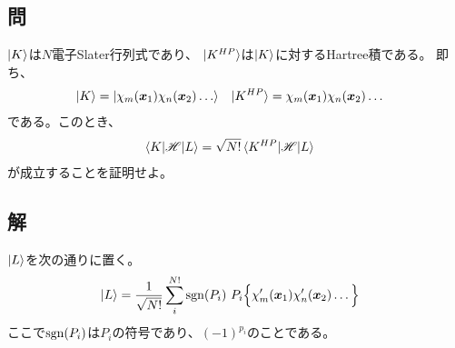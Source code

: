 \subsection{問}
$\ket{K}$は$N$電子Slater行列式であり、
$\ket{K^{HP}}$は$\ket{K}$に対するHartree積である。
即ち、
\begin{align}
	\ket{K}
&=
	\ket{\chi_m(\x_1)\chi_n(\x_2)\dots} &
%
	\ket{K^{HP}}
&=
	\chi_m(\x_1)\chi_n(\x_2)\dots
\end{align}
である。このとき、
\begin{align}
	\braket{K|\mathscr{H}|L}
&=
	\sqrt{N!}
	\braket{K^{HP}|\mathscr{H}|L}
\end{align}
が成立することを証明せよ。


\subsection{解}
$\ket{L}$を次の通りに置く。
\begin{align}
	\ket{L}
&=
	\frac{1}{\sqrt{N!}}
	\sum_{i}^{N!}
		{\rm sgn}(P_i)\
		P_i\Bigl\{
			\chi_m'({\bm{x}}_1) \chi_n'({\bm{x}}_2) \dots
		\Bigr\}
\end{align}
ここで${\rm sgn}(P_i)$は$P_i$の符号であり、$(-1)^{p_i}$のことである。

